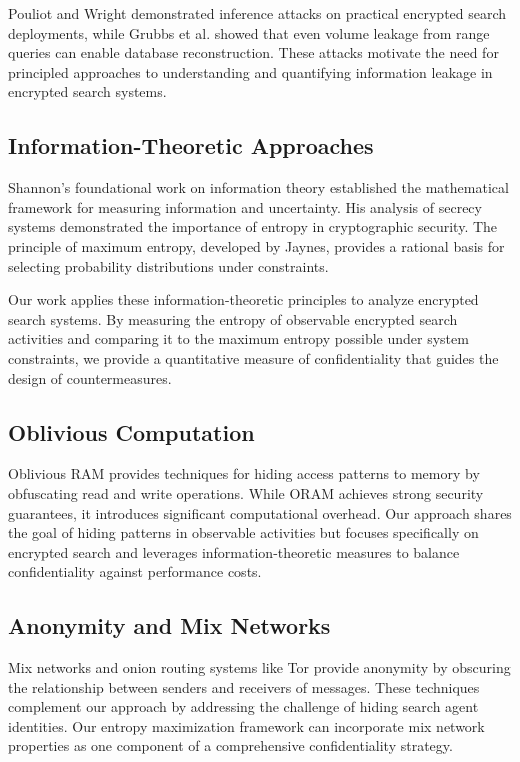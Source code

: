 \documentclass[final,11pt]{article}
\numberwithin{equation}{section}
\theoremstyle{plain}
\theoremstyle{remark}
\begin{document}
Pouliot and Wright\cite{pouliot2016shadow} demonstrated inference attacks on practical encrypted search deployments, while Grubbs et al.\cite{grubbs2017pump} showed that even volume leakage from range queries can enable database reconstruction. These attacks motivate the need for principled approaches to understanding and quantifying information leakage in encrypted search systems.

\subsection{Information-Theoretic Approaches}
Shannon's foundational work on information theory\cite{shannon1948mathematical,shannon1949communication} established the mathematical framework for measuring information and uncertainty. His analysis of secrecy systems demonstrated the importance of entropy in cryptographic security. The principle of maximum entropy, developed by Jaynes\cite{jaynes1957information,jaynes1982rationale}, provides a rational basis for selecting probability distributions under constraints.

Our work applies these information-theoretic principles to analyze encrypted search systems. By measuring the entropy of observable encrypted search activities and comparing it to the maximum entropy possible under system constraints, we provide a quantitative measure of confidentiality that guides the design of countermeasures.

\subsection{Oblivious Computation}
Oblivious RAM\cite{goldreich1996software,stefanov2013path} provides techniques for hiding access patterns to memory by obfuscating read and write operations. While ORAM achieves strong security guarantees, it introduces significant computational overhead. Our approach shares the goal of hiding patterns in observable activities but focuses specifically on encrypted search and leverages information-theoretic measures to balance confidentiality against performance costs.

\subsection{Anonymity and Mix Networks}
Mix networks\cite{chaum1981untraceable} and onion routing systems like Tor\cite{dingledine2004tor} provide anonymity by obscuring the relationship between senders and receivers of messages. These techniques complement our approach by addressing the challenge of hiding search agent identities. Our entropy maximization framework can incorporate mix network properties as one component of a comprehensive confidentiality strategy.
\end{document}
